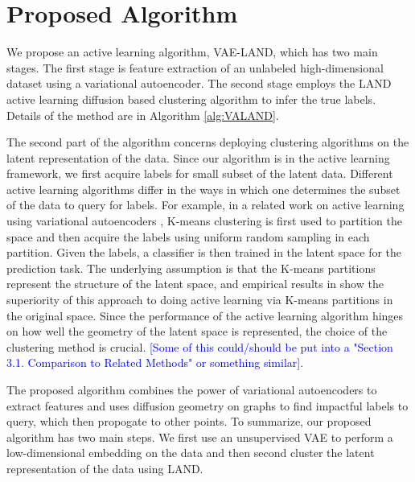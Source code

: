 \documentclass{article}
\newcommand{\JMM}[1]{{\textcolor{blue}{[#1]}}}
\begin{document}
\section{Proposed Algorithm}
\label{sec:ProposedAlgorithm}
We propose an active learning algorithm, VAE-LAND, which has two main stages. The first stage is feature extraction of an unlabeled high-dimensional dataset using a variational autoencoder. The second stage employs the LAND active learning diffusion based clustering algorithm to infer the true labels. Details of the method are in Algorithm \ref{alg:VALAND}.

The second part of the algorithm concerns deploying clustering algorithms on the latent representation of the data. Since our algorithm is in the active learning framework, we first acquire labels for small subset of the latent data. Different active learning algorithms differ in the ways in which one determines the subset of the data to query for labels. For example, in a related work on active learning using variational autoencoders \cite{pourkamali2019effectiveness}, K-means clustering is first used to partition the space and then acquire the labels using uniform random sampling in each partition. Given the labels, a classifier is then trained in the latent space for the prediction task. The underlying assumption is that the K-means partitions represent the structure of the latent space, and empirical results in \cite{pourkamali2019effectiveness} show the superiority of this approach to doing active learning via K-means partitions in the original space.
Since the performance of the active learning algorithm hinges on how well the geometry of the latent space is represented, the choice of the clustering method is crucial. \JMM{Some of this could/should be put into a "Section 3.1. Comparison to Related Methods" or something similar}.


The proposed algorithm combines the power of variational autoencoders to extract features and uses diffusion geometry on graphs to find impactful labels to query, which then propogate to other points. To summarize, our proposed algorithm has two main steps.  We first use an unsupervised VAE to perform a low-dimensional embedding on the data and then second cluster the latent representation of the data using LAND. 
\end{document}
